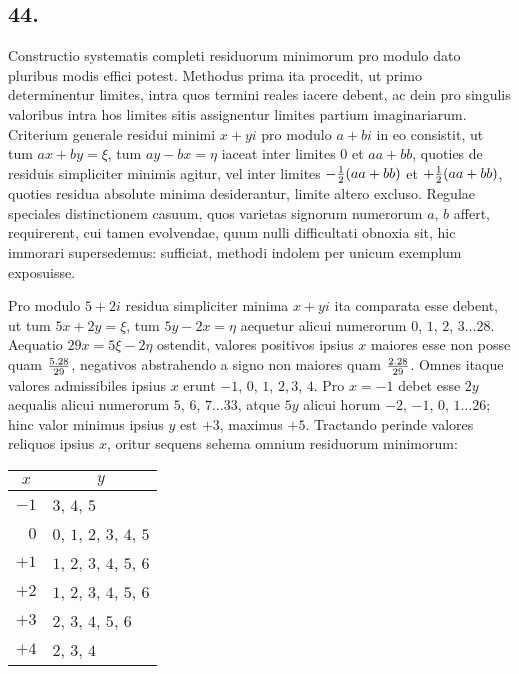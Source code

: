 \documentclass[twoside,12pt]{memoir}
\let\oldfrac\frac
\def\frac#1#2{\mathchoice{\tfrac{#1}{#2}}{\oldfrac{#1}{#2}}{\genfrac{}{}{}{2}{#1}{#2\mathstrut}}{\genfrac{}{}{}{3}{#1}{#2\mathstrut}}}
\begin{document}
\subsection*{44.}
 
Constructio systematis completi residuorum minimorum pro modulo dato pluribus modis effici potest. Methodus prima ita procedit, ut primo determinentur limites, intra quos termini reales iacere debent, ac dein pro singulis valoribus intra hos limites sitis assignentur limites partium imaginariarum. Criterium generale residui minimi \(x+y i\) pro modulo \(a+b i\) in eo consistit, ut tum \(a x+b y=\xi\), tum \(a y-b x=\eta\) iaceat inter limites \(0\) et \(a a+b b\), quoties de residuis simpliciter minimis agitur, vel inter limites \(-\frac{1}{2}(a a+b b)\) et \(+\frac{1}{2}(a a+b b)\), quoties residua absolute minima desiderantur, limite altero excluso. Regulae speciales distinctionem casuum, quos varietas signorum numerorum \(a\), \(b\) affert, requirerent, cui tamen evolvendae, quum nulli difficultati obnoxia sit, hic immorari supersedemus: sufficiat, methodi indolem per unicum exemplum exposuisse.

Pro modulo \(5+2 i\) residua simpliciter minima \(x+y i\) ita comparata esse debent, ut tum \(5 x+2 y=\xi\), tum \(5 y-2 x=\eta\) aequetur alicui numerorum \(0\), \(1\), \(2\), \(3 \ldots 28\). Aequatio \(29 x=5 \xi-2 \eta\) ostendit, valores positivos ipsius \(x\) maiores esse non posse quam \(\frac{5.28}{29}\), negativos abstrahendo a signo non maiores quam \(\frac{2.28}{29}\). Omnes itaque valores admissibiles ipsius \(x\) erunt \(-1\), \(0\), \(1\), \(2, 3\), \(4\). Pro \(x=-1\) debet esse \(2 y\) aequalis alicui numerorum \(5\), \(6\), \(7 \ldots 33\), atque \(5 y\) alicui horum \(-2\), \(-1\), \(0\), \(1 \ldots 26\); hinc valor minimus ipsius \(y\) est \(+3\), maximus \(+5\). Tractando perinde valores reliquos ipsius \(x\), oritur sequens sehema omnium residuorum minimorum:\pagebreak%
\begin{center}
\begin{tabular}{r|l}
\multicolumn{1}{c|}{\(x\)} & \multicolumn{1}{c}{\(y\)} \\
\hline
\(-1\) & \(3\), \(4\), \(5\) \\
\(0\) & \(0\), \(1\), \(2\), \(3\), \(4\), \(5\) \\
\(+1\) & \(1\), \(2\), \(3\), \(4\), \(5\), \(6\) \\
\(+2\) & \(1\), \(2\), \(3\), \(4\), \(5\), \(6\) \\
\(+3\) & \(2\), \(3\), \(4\), \(5\), \(6\) \\
\(+4\) & \(2\), \(3\), \(4\) \\
\end{tabular}
\end{center}
\end{document}
